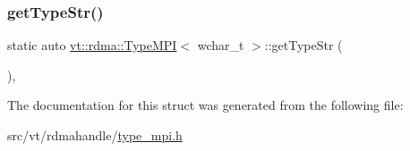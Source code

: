 \mbox{\label{structvt_1_1rdma_1_1_type_m_p_i_3_01wchar__t_01_4_a166dfb644615ae5ceab5fd65135c19bd}} 
\subsubsection{\texorpdfstring{get\+Type\+Str()}{getTypeStr()}}
{\footnotesize\ttfamily static auto \hyperlink{structvt_1_1rdma_1_1_type_m_p_i}{vt\+::rdma\+::\+Type\+M\+PI}$<$ wchar\+\_\+t $>$\+::get\+Type\+Str (\begin{DoxyParamCaption}{ }\end{DoxyParamCaption})\hspace{0.3cm}{\ttfamily [inline]}, {\ttfamily [static]}}



The documentation for this struct was generated from the following file\+:\begin{DoxyCompactItemize}
\item 
src/vt/rdmahandle/\hyperlink{type__mpi_8h}{type\+\_\+mpi.\+h}\end{DoxyCompactItemize}

